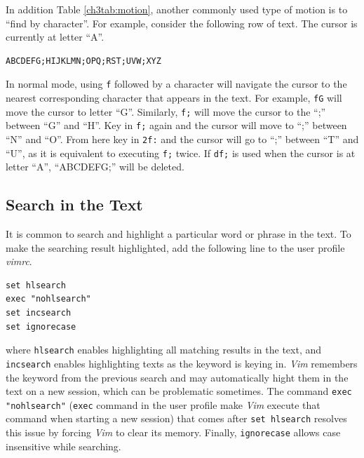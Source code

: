 In addition Table \ref{ch3tab:motion}, another commonly used type of motion is to ``find by character''. For example, consider the following row of text. The cursor is currently at letter ``A''.
\begin{verbatim}
ABCDEFG;HIJKLMN;OPQ;RST;UVW;XYZ
\end{verbatim}
In normal mode, using \verb|f| followed by a character will navigate the cursor to the nearest corresponding character that appears in the text. For example, \verb|fG| will move the cursor to letter ``G''. Similarly, \verb|f;| will move the cursor to the ``;'' between ``G'' and ``H''. Key in \verb|f;| again and the cursor will move to ``;'' between ``N'' and ``O''. From here key in \verb|2f:| and the cursor will go to ``;'' between ``T'' and ``U'', as it is equivalent to executing \verb|f;| twice. If \verb|df;| is used when the cursor is at letter ``A'', ``ABCDEFG;'' will be deleted.

\subsection{Search in the Text}

It is common to search and highlight a particular word or phrase in the text. To make the searching result highlighted, add the following line to the user profile \textit{vimrc}.
\begin{verbatim}
set hlsearch
exec "nohlsearch"
set incsearch
set ignorecase
\end{verbatim}
where \verb|hlsearch| enables highlighting all matching results in the text, and \verb|incsearch| enables highlighting texts as the keyword is keying in. \textit{Vim} remembers the keyword from the previous search and may automatically hight them in the text on a new session, which can be problematic sometimes. The command \verb|exec "nohlsearch"| (\verb|exec| command in the user profile make \textit{Vim} execute that command when starting a new session) that comes after \verb|set hlsearch| resolves this issue by forcing \textit{Vim} to clear its memory. Finally, \verb|ignorecase| allows case insensitive while searching.

